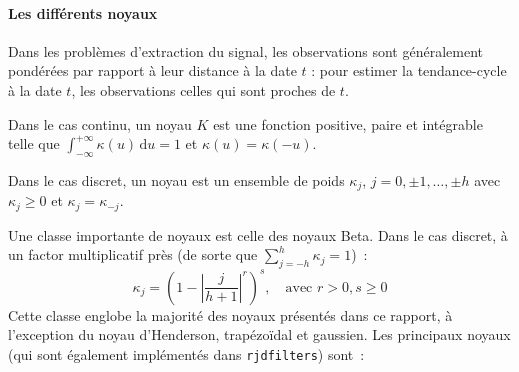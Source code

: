 \documentclass[
  11pt,
  french,
  a4paper]{article}
\newcommand\1{\mathds{1}}
\newcommand\ud{\,\mathrm{d}}
\begin{document}
\hypertarget{sec-kernels}{%
\paragraph{Les différents noyaux}\label{sec-kernels}}

Dans les problèmes d'extraction du signal, les observations sont généralement pondérées par rapport à leur distance à la date \(t\) : pour estimer la tendance-cycle à la date \(t\), les observations celles qui sont proches de \(t\).

Dans le cas continu, un noyau \(K\) est une fonction positive, paire et intégrable telle que \(\int_{-\infty}^{+\infty}\kappa(u) \ud u=1\) et \(\kappa(u)=\kappa(-u)\).

Dans le cas discret, un noyau est un ensemble de poids \(\kappa_j\), \(j=0,\pm1,\dots,\pm h\) avec \(\kappa_j \geq0\) et \(\kappa_j=\kappa_{-j}\).

Une classe importante de noyaux est celle des noyaux Beta.
Dans le cas discret, à un factor multiplicatif près (de sorte que \(\sum_{j=-h}^h\kappa_j=1\))~:
\[
\kappa_j = \left(
  1-
  \left\lvert
  \frac j {h+1}
  \right\lvert^r
\right)^s,\quad\text{avec }r>0,s\geq 0
\]
Cette classe englobe la majorité des noyaux présentés dans ce rapport, à l'exception du noyau d'Henderson, trapézoïdal et gaussien.
Les principaux noyaux (qui sont également implémentés dans \texttt{rjdfilters}) sont~:
\end{document}
